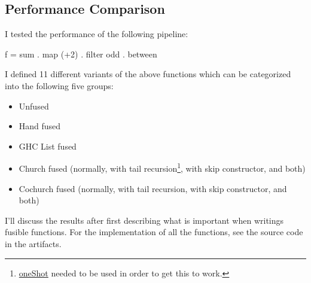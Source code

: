 \subsection{Performance Comparison}\label{sec:hask_perf}
I tested the performance of the following pipeline:
\begin{spec}
f = sum . map (+2) . filter odd . between
\end{spec}
I defined 11 different variants of the above functions which can be categorized into the following five groups:
\begin{itemize}[noitemsep]
\item Unfused
\item Hand fused
\item GHC List fused
\item Church fused (normally, with tail recursion\footnote{\href{https://gitlab.haskell.org/ghc/ghc/-/wikis/one-shot}{oneShot} needed to be used in order to get this to work.}, with skip constructor, and both)
\item Cochurch fused (normally, with tail recursion, with skip constructor, and both)
\end{itemize}

I'll discuss the results after first describing what is important when writings fusible functions.  For the implementation of all the functions, see the source code in the artifacts.

